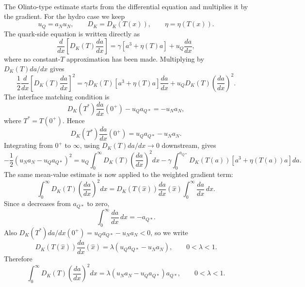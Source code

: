 The Olinto-type estimate starts from the differential equation and multiplies it
by the gradient. For the hydro case we keep
\begin{equation}
u_Q=a_Nu_N,\qquad
D_K=D_K(T(x)),\qquad
\eta=\eta(T(x)).
\end{equation}
The quark-side equation is written directly as
\begin{equation}
\frac{d}{dx}\left[D_K(T)\frac{da}{dx}\right]
=
\gamma\left[a^3+\eta(T)a\right]
+u_Q\frac{da}{dx},
\end{equation}
where no constant-\(T\) approximation has been made. Multiplying by
\(D_K(T)da/dx\) gives
\begin{equation}
\frac{1}{2}
\frac{d}{dx}
\left[
D_K(T)\frac{da}{dx}
\right]^2
=
\gamma D_K(T)\left[a^3+\eta(T)a\right]\frac{da}{dx}
+u_QD_K(T)\left(\frac{da}{dx}\right)^2 .
\end{equation}
The interface matching condition is
\begin{equation}
D_K(T^*)\frac{da}{dx}(0^+)-u_Qa_{Q*}=-u_Na_N ,
\end{equation}
where \(T^*=T(0^+)\). Hence
\begin{equation}
D_K(T^*)\frac{da}{dx}(0^+)
=
u_Qa_{Q*}-u_Na_N .
\end{equation}
Integrating from \(0^+\) to \(\infty\), using
\(D_K(T)da/dx\to0\) downstream, gives
\begin{equation}
-\frac{1}{2}
\left(u_Na_N-u_Qa_{Q*}\right)^2
=
u_Q\int_0^\infty
D_K(T)\left(\frac{da}{dx}\right)^2 dx
-
\gamma
\int_0^{a_{Q*}}
D_K(T(a))
\left[a^3+\eta(T(a))a\right] da .
\end{equation}
The same mean-value estimate is now applied to the weighted gradient term:
\begin{equation}
\int_0^\infty
D_K(T)\left(\frac{da}{dx}\right)^2 dx
=
D_K(T(\hat x))\frac{da}{dx}(\hat x)
\int_0^\infty \frac{da}{dx}\,dx .
\end{equation}
Since \(a\) decreases from \(a_{Q*}\) to zero,
\begin{equation}
\int_0^\infty \frac{da}{dx}\,dx=-a_{Q*}.
\end{equation}
Also \(D_K(T^*)da/dx(0^+)=u_Qa_{Q*}-u_Na_N<0\), so we write
\begin{equation}
D_K(T(\hat x))\frac{da}{dx}(\hat x)
=
\lambda\left(u_Qa_{Q*}-u_Na_N\right),
\qquad
0<\lambda<1 .
\end{equation}
Therefore
\begin{equation}
\int_0^\infty
D_K(T)\left(\frac{da}{dx}\right)^2 dx
=
\lambda
\left(u_Na_N-u_Qa_{Q*}\right)a_{Q*},
\qquad
0<\lambda<1 .
\end{equation}
